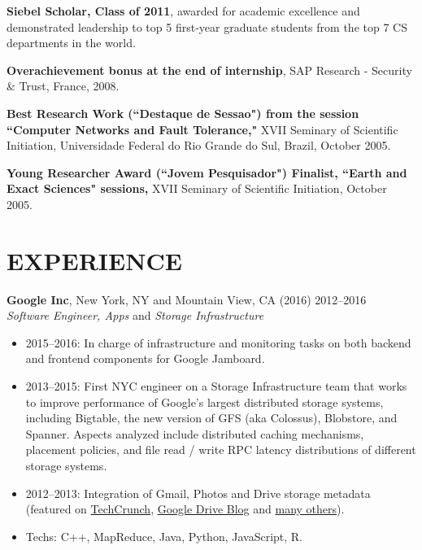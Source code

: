 \documentclass[line,margin]{res}
\begin{document}
\begin{resume}
\textbf{Siebel Scholar, Class of 2011}, awarded for academic excellence and demonstrated leadership to top 5 first-year graduate students from the top 7 CS departments in the world.

\textbf{Overachievement bonus at the end of internship}, SAP Research - Security \& Trust, France, 2008.

\textbf{Best Research Work (``Destaque de Sessao") from the session ``Computer Networks and Fault Tolerance,"} XVII Seminary of Scientific Initiation, Universidade Federal do Rio Grande do Sul, Brazil, October 2005.

\textbf{Young Researcher Award (``Jovem Pesquisador") Finalist, ``Earth and Exact Sciences" sessions,} XVII Seminary of Scientific Initiation, October 2005.

\section{EXPERIENCE} \textbf{Google Inc}, New York, NY and Mountain View, CA (2016) \hfill 2012--2016 \\
{\sl Software Engineer, Apps} and {\sl Storage Infrastructure}
                \begin{itemize}  \itemsep -2pt
                \item  2015--2016: In charge of infrastructure and monitoring tasks on both backend and frontend components for Google Jamboard.
                \item  2013--2015: First NYC engineer on a Storage Infrastructure team that works to improve 
                performance of Google's largest distributed storage systems, including Bigtable, the new 
                version of GFS (aka Colossus), Blobstore, and Spanner.  Aspects analyzed include 
                distributed caching mechanisms, placement policies, and file read / write RPC latency 
                distributions of different storage systems.
		\item 2012--2013: Integration of Gmail, Photos and Drive storage metadata (featured on 
		\href{http://goo.gl/y8cpvZ}{TechCrunch}, \href{http://googledrive.blogspot.com/2013/05/bringing-it-all-together-15-gb-now.html}{Google Drive Blog}
		and \href{https://www.google.com/search?q=google\%20unifies\%20drive\%20gmail\%20google\%20photos\%2015gb}{many others}).
		\item Techs: C++, MapReduce, Java, Python, JavaScript, R.
                \end{itemize}
                

\end{resume}
\end{document}
